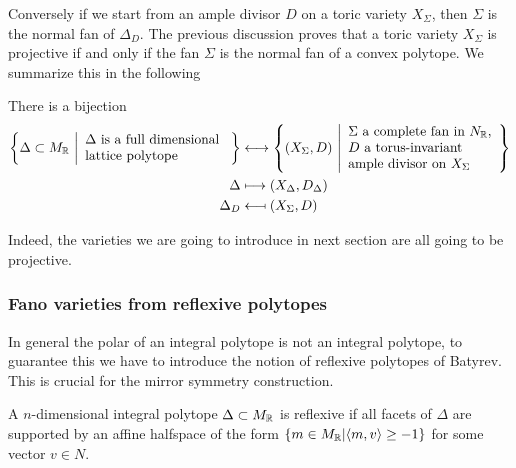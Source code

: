 \documentclass[../main.tex]{subfiles}
\begin{document}
Conversely if we start from an ample divisor $D$ on a toric variety $X_{\Sigma}$, then $\Sigma$ is the normal fan of $\Delta_D$.
The previous discussion proves that a toric variety $X_{\Sigma}$ is projective if and only if the fan $\Sigma$ is the normal fan of a convex polytope. We summarize this in the following

\begin{theorem} \textup{\cite[Thm. 6.2.1]{CLS11}}
    There is a bijection
    \begin{align*}
 \left\{ \Delta \subset M_\RR \ \middle\vert \begin{array}{l}
     \Delta \textrm{ is a full dimensional } \\
    \textrm{lattice polytope }
  \end{array}\right\} &\longleftrightarrow  \left\{ (X_\Sigma,D) \ \middle\vert \begin{array}{l}
     \Sigma \text{ a complete fan in } N_\RR, \\
    D \text{ a torus-invariant } \\ 
   \text{ample divisor on } X_\Sigma
  \end{array}\right\} \\
\Delta &\longmapsto (X_\Delta, D_\Delta) \\
\Delta_D &\longmapsfrom (X_\Sigma,D) 
    \end{align*}

\end{theorem}


Indeed, the varieties we are going to introduce in next section are all going to be projective.




\subsubsection{Fano varieties from reflexive polytopes}


In general the polar of an integral polytope is not an integral polytope, to guarantee this we have to introduce the notion of reflexive polytopes of Batyrev. This is crucial for the mirror symmetry construction.
\begin{defn}
    A $n$-dimensional integral polytope $\Delta \subset M_{\mathbb{R}}$ is reflexive if all facets of $\Delta$ are supported by an affine halfspace of the form $ \{ m \in M_{\mathbb{R}} | \langle m, v\rangle \geq -1 \}$ for some vector $v \in N$. 
\end{defn} 
\end{document}
